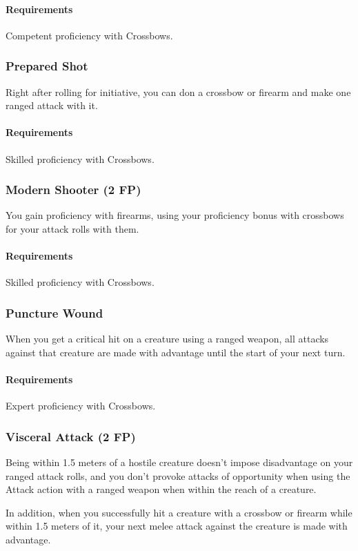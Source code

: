     \paragraph{Requirements} Competent proficiency with Crossbows.
\subsubsection{Prepared Shot} \label{feat::preparedshot}
    Right after rolling for initiative, you can don a crossbow or firearm and make one ranged attack with it.
    \paragraph{Requirements} Skilled proficiency with Crossbows.
\subsubsection{Modern Shooter (2 FP)} \label{feat::modernshooter}
    You gain proficiency with firearms, using your proficiency bonus with crossbows for your attack rolls with them.
    \paragraph{Requirements} Skilled proficiency with Crossbows.
\subsubsection{Puncture Wound} \label{feat::puncturewound}
    When you get a critical hit on a creature using a ranged weapon, all attacks against that creature are made with advantage until the start of your next turn.
    \paragraph{Requirements} Expert proficiency with Crossbows.
\subsubsection{Visceral Attack (2 FP)} \label{feat::visceralattack}
    Being within 1.5 meters of a hostile creature doesn't impose disadvantage on your ranged attack rolls, and you don't provoke attacks of opportunity when using the Attack action with a ranged weapon when within the reach of a creature.

    In addition, when you successfully hit a creature with a crossbow or firearm while within 1.5 meters of it, your next melee attack against the creature is made with advantage.
